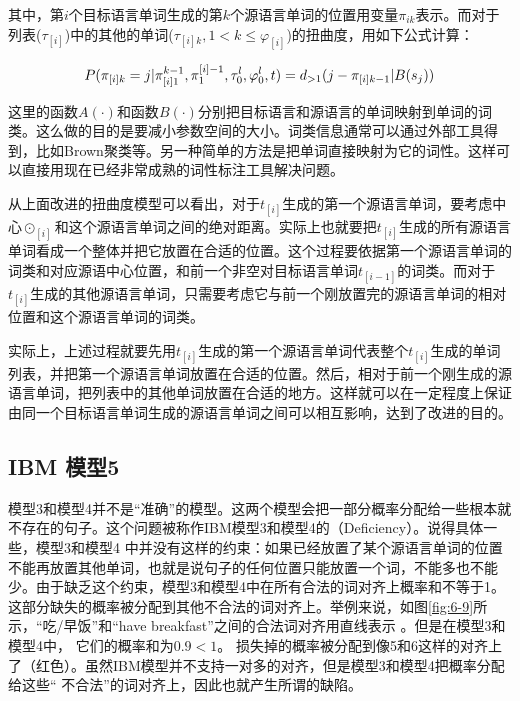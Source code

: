 \noindent 其中，第$i$个目标语言单词生成的第$k$个源语言单词的位置用变量$\pi_{ik}$表示。而对于列表($\tau_{[i]}$)中的其他的单词($\tau_{[i]k},1 < k \le \varphi_{[i]}$)的扭曲度，用如下公式计算：

\begin{equation}
{P}(\pi_{[i]k}=j|{\pi}_{[i]1}^{k-1},\pi_1^{[i]-1},\tau_0^l,\varphi_0^l,{t})=d_{>1}(j-\pi_{[i]k-1}|B(s_j))
\label{eq:6-23}
\end{equation}

\parinterval 这里的函数$A(\cdot)$和函数$B(\cdot)$分别把目标语言和源语言的单词映射到单词的词类。这么做的目的是要减小参数空间的大小。词类信息通常可以通过外部工具得到，比如Brown聚类等。另一种简单的方法是把单词直接映射为它的词性。这样可以直接用现在已经非常成熟的词性标注工具解决问题。

\parinterval 从上面改进的扭曲度模型可以看出，对于$t_{[i]}$生成的第一个源语言单词，要考虑中心$\odot_{[i]}$和这个源语言单词之间的绝对距离。实际上也就要把$t_{[i]}$生成的所有源语言单词看成一个整体并把它放置在合适的位置。这个过程要依据第一个源语言单词的词类和对应源语中心位置，和前一个非空对目标语言单词$t_{[i-1]}$的词类。而对于$t_{[i]}$生成的其他源语言单词，只需要考虑它与前一个刚放置完的源语言单词的相对位置和这个源语言单词的词类。

\parinterval 实际上，上述过程就要先用$t_{[i]}$生成的第一个源语言单词代表整个$t_{[i]}$生成的单词列表，并把第一个源语言单词放置在合适的位置。然后，相对于前一个刚生成的源语言单词，把列表中的其他单词放置在合适的地方。这样就可以在一定程度上保证由同一个目标语言单词生成的源语言单词之间可以相互影响，达到了改进的目的。


\subsection{ IBM 模型5}

\parinterval 模型3和模型4并不是“准确”的模型。这两个模型会把一部分概率分配给一些根本就不存在的句子。这个问题被称作IBM模型3和模型4的{\small{}}（Deficiency）。说得具体一些，模型3和模型4 中并没有这样的约束：如果已经放置了某个源语言单词的位置不能再放置其他单词，也就是说句子的任何位置只能放置一个词，不能多也不能少。由于缺乏这个约束，模型3和模型4中在所有合法的词对齐上概率和不等于1。 这部分缺失的概率被分配到其他不合法的词对齐上。举例来说，如图\ref{fig:6-9}所示，“吃/早饭”和“have breakfast”之间的合法词对齐用直线表示 。但是在模型3和模型4中， 它们的概率和为$0.9<1$。 损失掉的概率被分配到像5和6这样的对齐上了（红色）。虽然IBM模型并不支持一对多的对齐，但是模型3和模型4把概率分配给这些“ 不合法”的词对齐上，因此也就产生所谓的缺陷。

